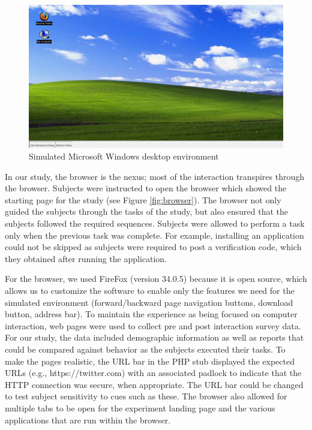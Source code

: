 \begin{figure}[!ht]
  \centering
\includegraphics[width=\columnwidth]{img/desktop.png}
  \caption{Simulated Microsoft Windows desktop environment}
  \label{fig:desktop}
\end{figure}

In our study, the browser is the nexus; most of the interaction transpires through the browser. Subjects were instructed to open the browser which showed the starting page for the study (see
Figure \ref{fig:browser}). The browser not only guided the subjects through the tasks of the study, but also ensured that the subjects followed the required sequences. Subjects were allowed to perform a task only when the previous task was complete. For example, installing an application could not be skipped as subjects were required to post a verification code, which they obtained after running the application.

For the browser, we used FireFox (version 34.0.5) because it is open source, which allows us to customize the software to enable only the features we need for the simulated environment (forward/backward page navigation buttons, download button, address bar). To maintain the experience as being focused on computer interaction, web pages were used to collect pre and post interaction survey data. For our study, the data included demographic information as well as reports that could be compared against behavior as the subjects executed their tasks. To make the pages realistic, the URL bar in the PHP stub displayed the expected URLs (e.g., https://twitter.com) with an associated padlock to indicate that the HTTP connection was secure, when appropriate. The URL bar could be changed to test subject sensitivity to cues such as these. The browser also allowed for multiple tabs to be open for the experiment landing page and the various applications that are run within the browser.

